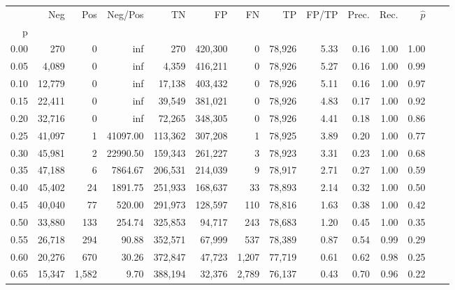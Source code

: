 \begin{tabular}{rrrrrrrrrrrrrr}
\toprule
{} &     Neg &     Pos &   Neg/Pos &       TN &       FP &      FN &      TP & FP/TP & Prec. &  Rec. & $\hat{p}$ \\
p    &         &         &           &          &          &         &         &       &       &       &           \\
\midrule
0.00 &     270 &       0 &       inf &      270 &  420,300 &       0 &  78,926 &  5.33 &  0.16 &  1.00 &      1.00 \\
0.05 &   4,089 &       0 &       inf &    4,359 &  416,211 &       0 &  78,926 &  5.27 &  0.16 &  1.00 &      0.99 \\
0.10 &  12,779 &       0 &       inf &   17,138 &  403,432 &       0 &  78,926 &  5.11 &  0.16 &  1.00 &      0.97 \\
0.15 &  22,411 &       0 &       inf &   39,549 &  381,021 &       0 &  78,926 &  4.83 &  0.17 &  1.00 &      0.92 \\
0.20 &  32,716 &       0 &       inf &   72,265 &  348,305 &       0 &  78,926 &  4.41 &  0.18 &  1.00 &      0.86 \\
0.25 &  41,097 &       1 &  41097.00 &  113,362 &  307,208 &       1 &  78,925 &  3.89 &  0.20 &  1.00 &      0.77 \\
0.30 &  45,981 &       2 &  22990.50 &  159,343 &  261,227 &       3 &  78,923 &  3.31 &  0.23 &  1.00 &      0.68 \\
0.35 &  47,188 &       6 &   7864.67 &  206,531 &  214,039 &       9 &  78,917 &  2.71 &  0.27 &  1.00 &      0.59 \\
0.40 &  45,402 &      24 &   1891.75 &  251,933 &  168,637 &      33 &  78,893 &  2.14 &  0.32 &  1.00 &      0.50 \\
0.45 &  40,040 &      77 &    520.00 &  291,973 &  128,597 &     110 &  78,816 &  1.63 &  0.38 &  1.00 &      0.42 \\
0.50 &  33,880 &     133 &    254.74 &  325,853 &   94,717 &     243 &  78,683 &  1.20 &  0.45 &  1.00 &      0.35 \\
0.55 &  26,718 &     294 &     90.88 &  352,571 &   67,999 &     537 &  78,389 &  0.87 &  0.54 &  0.99 &      0.29 \\
0.60 &  20,276 &     670 &     30.26 &  372,847 &   47,723 &   1,207 &  77,719 &  0.61 &  0.62 &  0.98 &      0.25 \\
0.65 &  15,347 &   1,582 &      9.70 &  388,194 &   32,376 &   2,789 &  76,137 &  0.43 &  0.70 &  0.96 &      0.22 \\

\end{tabular}
